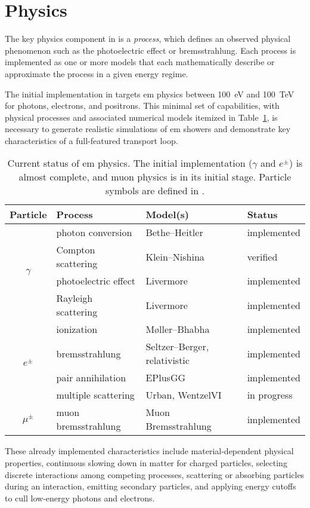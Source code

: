\section{Physics}

The key physics component in \celeritas is a \emph{process}, which defines an
observed physical phenomenon such as the photoelectric effect or bremsstrahlung.
Each process is implemented as one or more models that each mathematically
describe or approximate the process in a given energy regime.

The initial implementation in \celeritas targets \ac{em} physics between
\SI{100}{eV} and \SI{100}{TeV} for photons, electrons, and positrons. This
minimal set of capabilities, with physical processes and associated numerical
models itemized in Table~\ref{tab:em-physics}, is necessary to generate
realistic simulations of \ac{em} showers and demonstrate key characteristics of
a full-featured transport loop.
\begin{table}
  \caption{Current status of \celeritas \acs{em} physics. The initial
  implementation ($\gamma$ and $e^\pm$) is almost complete, and muon physics is
  in its initial stage. Particle symbols are defined in
  \textcite{tanabashi_review_2018}.}
  \label{tab:em-physics}
  \centering
  \begin{tabular}{clll}\toprule Particle & Process & Model(s) & Status\\
    \midrule
    \multirow{4}{*}{$\gamma$}
    & photon conversion & Bethe--Heitler & implemented\\
    & Compton scattering & Klein--Nishina & verified\\
    & photoelectric effect & Livermore & implemented\\
    & Rayleigh scattering & Livermore & implemented\\
    \midrule
    \multirow{4}{*}{$e^\pm$}
    & ionization & M\o{}ller--Bhabha & implemented\\
    & bremsstrahlung & Seltzer--Berger, relativistic & implemented\\
    & pair annihilation & EPlusGG & implemented\\
    & multiple scattering & Urban, WentzelVI & in progress\\
    \midrule
    $\mu^\pm$ & muon bremsstrahlung & Muon Bremsstrahlung & implemented\\
    \bottomrule
  \end{tabular}
\end{table}
These already implemented characteristics include  material-dependent
physical properties,  continuous slowing down in matter for charged
particles,  selecting discrete interactions among competing processes,
 scattering or absorbing particles during an interaction, 
emitting secondary particles, and  applying energy cutoffs to cull
low-energy photons and electrons.

